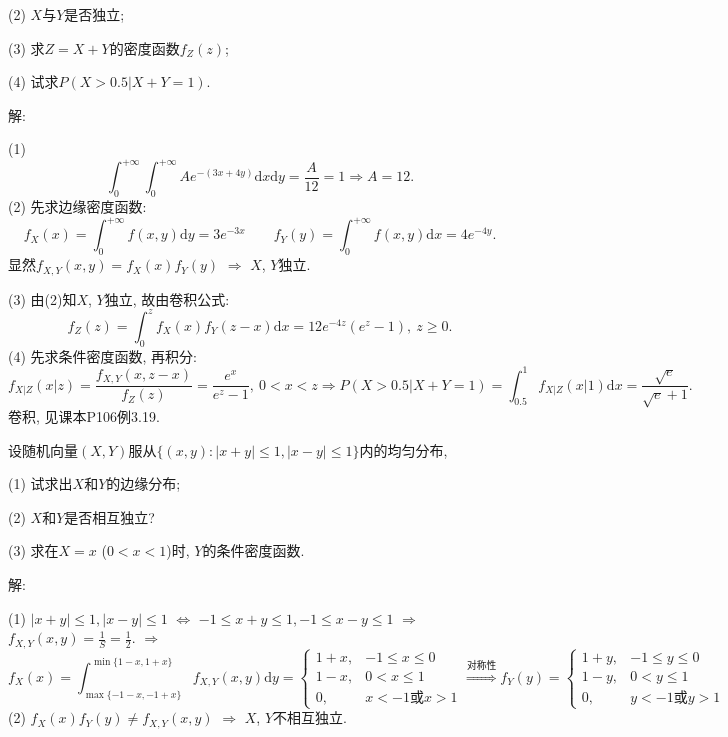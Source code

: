 \documentclass[standard]{ExBook}
\renewenvironment{shaded}{%
  \def\FrameCommand{\fboxsep=\FrameSep \colorbox{shadecolor}}%
  \MakeFramed{\advance\hsize-\width \FrameRestore}%
}{%
  \endMakeFramed
}
\begin{document}
\begin{qitems}
\begin{bbox}
\begin{shaded}
(2) $X$与$Y$是否独立;

(3) 求$Z=X+Y$的密度函数$f_{Z}(z)$;

(4) 试求$P(X>0.5|X+Y=1)$.
    \end{shaded}
    \end{bbox}

\vspace{\dimexpr2.5cm-5em\relax}

解: 

(1)
$$\int_{0}^{+\infty}\int_{0}^{+\infty}A e^{-(3x+4y)}\mathrm{d}x\mathrm{d}y=\frac{A}{12}=1 \Longrightarrow A=12.$$
(2) 先求边缘密度函数:
$$f_{X}(x)=\int_{0}^{+\infty}f(x,y)\mathrm{d}y=3e^{-3x}\qquad f_{Y}(y)=\int_{0}^{+\infty}f(x,y)\mathrm{d}x=4e^{-4y}.$$
显然$f_{X,Y}(x,y)=f_{X}(x)f_{Y}(y)$ $\Longrightarrow$ $X$, $Y$独立.

(3) 由(2)知$X$, $Y$独立, 故由卷积公式:
$$f_{Z}(z)=\int_{0}^{z}f_{X}(x)f_{Y}(z-x)\mathrm{d}x=12e^{-4z}(e^{z}-1),\ z\geq0.$$
(4) 先求条件密度函数, 再积分:
$$f_{X|Z}(x|z)=\frac{f_{X,Y}(x,z-x)}{f_{Z}(z)}=\frac{e^{x}}{e^{z}-1},\ 0<x<z \Longrightarrow P(X>0.5|X+Y=1)=\int_{0.5}^{1}f_{X|Z}(x|1)\mathrm{d}x=\frac{\sqrt{e}}{\sqrt{e}+1}.$$
\textcolor{themeColor}{\selectfont {} 卷积, 见课本P106例3.19.}

\vspace{2.5cm-5em}

    \begin{bbox}
    \begin{shaded}
        \qitem
设随机向量$(X,Y)$服从$\{(x,y):|x+y|\leq1,|x-y|\leq1\}$内的均匀分布,

(1) 试求出$X$和$Y$的边缘分布;

(2) $X$和$Y$是否相互独立?

(3) 求在$X=x$ ($0<x<1$)时, $Y$的条件密度函数.
    \end{shaded}
    \end{bbox}

\vspace{\dimexpr2.5cm-5em\relax}

解: 

(1) $|x+y|\leq1,|x-y|\leq1$ $\Longleftrightarrow$ $-1\leq x+y\leq1,-1\leq x-y\leq1$ $\Longrightarrow$ $f_{X,Y}(x,y)=\frac{1}{S}=\frac{1}{2}.$ $\Longrightarrow$
$$
    f_{X}(x)=\int_{\max\{-1-x,-1+x\}}^{\min\{1-x,1+x\}}f_{X,Y}(x,y)\mathrm{d}y=
    \left\{
    \begin{array}{ll}
        1+x, &-1\leq x\leq0\\
        1-x, &0< x\leq1\\
        0, &x<-1\text{或}x>1
    \end{array}
    \right.
    \overset{\text{对称性}}{\Longrightarrow}
    f_{Y}(y)=
    \left\{
    \begin{array}{ll}
        1+y, &-1\leq y\leq0\\
        1-y, &0< y\leq1\\
        0, &y<-1\text{或}y>1
    \end{array}
    \right.
$$
(2) $f_{X}(x)f_{Y}(y)\neq f_{X,Y}(x,y)$ $\Longrightarrow$ $X$, $Y$不相互独立.


\end{qitems}
\end{document}
